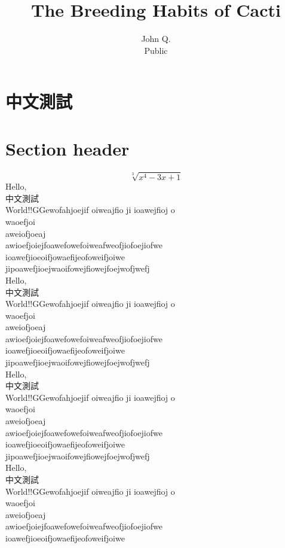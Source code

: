 \documentclass[12pt]{article}
\title{The Breeding Habits of Cacti}
\author{John Q.\\ Public}
\begin{document}
\maketitle
\section{中文測試}
\section{Section header}
\[\sqrt[3]{x^4-3x+1}\]
Hello, \\中文測試\\World!!GGewofahjoejif oiweajfio ji ioawejfioj o\\
waoefjoi\\
aweiofjoeaj\\
awioefjoiejfoawefowefoiweafweofjiofoejiofwe\\
ioawefjioeoifjowaefijeofoweifjoiwe\\
jipoawefjioejwaoifowejfiowejfoejwofjwefj\\
Hello, \\中文測試\\World!!GGewofahjoejif oiweajfio ji ioawejfioj o\\
waoefjoi\\
aweiofjoeaj\\
\newpage
awioefjoiejfoawefowefoiweafweofjiofoejiofwe\\
ioawefjioeoifjowaefijeofoweifjoiwe\\
jipoawefjioejwaoifowejfiowejfoejwofjwefj\\Hello, \\中文測試\\World!!GGewofahjoejif oiweajfio ji ioawejfioj o\\
waoefjoi\\
aweiofjoeaj\\
awioefjoiejfoawefowefoiweafweofjiofoejiofwe\\
ioawefjioeoifjowaefijeofoweifjoiwe\\
jipoawefjioejwaoifowejfiowejfoejwofjwefj\\Hello, \\中文測試\\World!!GGewofahjoejif oiweajfio ji ioawejfioj o\\
waoefjoi\\
aweiofjoeaj\\
awioefjoiejfoawefowefoiweafweofjiofoejiofwe\\
ioawefjioeoifjowaefijeofoweifjoiwe\\
\end{document}
